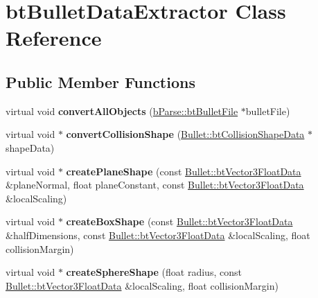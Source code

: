 \hypertarget{classbt_bullet_data_extractor}{\section{bt\+Bullet\+Data\+Extractor Class Reference}
\label{classbt_bullet_data_extractor}
}
\subsection*{Public Member Functions}
\begin{DoxyCompactItemize}
\item 
\hypertarget{classbt_bullet_data_extractor_aa0fbc949aff91e2d51368dcec5b2070e}{virtual void {\bfseries convert\+All\+Objects} (\hyperlink{classb_parse_1_1bt_bullet_file}{b\+Parse\+::bt\+Bullet\+File} $\ast$bullet\+File)}\label{classbt_bullet_data_extractor_aa0fbc949aff91e2d51368dcec5b2070e}

\item 
\hypertarget{classbt_bullet_data_extractor_a39a0e830e6f25adca62df94ef5eb4ab2}{virtual void $\ast$ {\bfseries convert\+Collision\+Shape} (\hyperlink{class_bullet_1_1bt_collision_shape_data}{Bullet\+::bt\+Collision\+Shape\+Data} $\ast$shape\+Data)}\label{classbt_bullet_data_extractor_a39a0e830e6f25adca62df94ef5eb4ab2}

\item 
\hypertarget{classbt_bullet_data_extractor_aafa1289c20ba5c7feff60e987d815beb}{virtual void $\ast$ {\bfseries create\+Plane\+Shape} (const \hyperlink{class_bullet_1_1bt_vector3_float_data}{Bullet\+::bt\+Vector3\+Float\+Data} \&plane\+Normal, float plane\+Constant, const \hyperlink{class_bullet_1_1bt_vector3_float_data}{Bullet\+::bt\+Vector3\+Float\+Data} \&local\+Scaling)}\label{classbt_bullet_data_extractor_aafa1289c20ba5c7feff60e987d815beb}

\item 
\hypertarget{classbt_bullet_data_extractor_ac1dcd47e44ad822f717296f47c776391}{virtual void $\ast$ {\bfseries create\+Box\+Shape} (const \hyperlink{class_bullet_1_1bt_vector3_float_data}{Bullet\+::bt\+Vector3\+Float\+Data} \&half\+Dimensions, const \hyperlink{class_bullet_1_1bt_vector3_float_data}{Bullet\+::bt\+Vector3\+Float\+Data} \&local\+Scaling, float collision\+Margin)}\label{classbt_bullet_data_extractor_ac1dcd47e44ad822f717296f47c776391}

\item 
\hypertarget{classbt_bullet_data_extractor_a28c2b0c3c3515b16544ffaeba1a59f9a}{virtual void $\ast$ {\bfseries create\+Sphere\+Shape} (float radius, const \hyperlink{class_bullet_1_1bt_vector3_float_data}{Bullet\+::bt\+Vector3\+Float\+Data} \&local\+Scaling, float collision\+Margin)}\label{classbt_bullet_data_extractor_a28c2b0c3c3515b16544ffaeba1a59f9a}

\end{DoxyCompactItemize}


